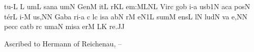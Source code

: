 \sgn t{u}{-}\punctum L\egn
\custos L\lineaproxima
\sgn {}um\punctum L\egn
\spatium
\sgn s{a}n\punctum a\egn
{}um\punctum N\egn
\spatium
\sgn Gen\punctum M\egn
\sgn {}it\punctum L\egn
{}r\pes KL\egn
\sgn {}e{m:}\clivis ML\augmentumduplex NL\egn
\spatium
\divisiomaior
\spatium
\sgn V{i}r\punctum c\egn
\sgn go{}\punctum b\egn
\spatium
{}i{-}\punctum a\egn
\sgn {}us\episem b1\punctum N\egn
\spatium
\sgn {}ac\punctum a\egn
\spatium
\sgn pos\punctum N\egn
\sgn t{\'e}r\punctum L\egn
\sgn {}i{-}\punctum M\egn
\sgn {}u{s,}\punctum N\augmentum N\egn
\spatium
\divisiominor
\spatium
\sgn Gab\punctum a\egn
\sgn ri{-}\punctum a\egn
\custos c
\lineaproxima
{}l\punctum c\egn
\sgn {}is\punctum a\egn
\spatium
\sgn {}ab\punctum N\egn
\spatium
{}r\punctum M\egn
\sgn {}e{}\episem N1\punctum L\egn
\spatium
\divisiominor
\spatium
\sgn s{u}m\punctum M\egn
\sgn {}e{ns}\punctum L\egn
\spatium
{}l\punctum N\egn
\sgn lud\punctum N\egn
\spatium
{}v\punctum a\egn
\sgn {}e,\punctum N\augmentum N\egn
\spatium
\divisiominor
\spatium
\sgn pec\punctum c\egn
\sgn cat\punctum b\egn
{}r\punctum c\egn
\sgn {}um\clivis aN\egn
\spatium
\sgn mis\punctum a\egn
\sgn {}er\punctum M\egn
{}\clivis LK\egn
\sgn re.\punctum J\augmentum J\egn
\spatium
\Finisgregoriana


\bigskip

\source Ascribed to Hermann of Reichenau, {}--


